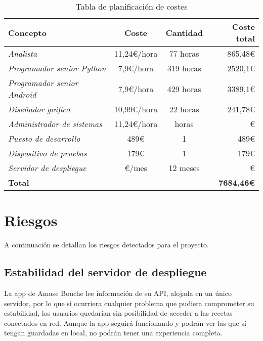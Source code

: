 \begin{table}[hbtp]
  \centering
  \begin{tabular}[h]{|l|c|c|r|}
    \hline
    \textbf{Concepto} & \textbf{Coste} & \textbf{Cantidad} & \textbf{Coste total} \\
    \hline
    \textit{Analista} & 11,24€/hora & 77 horas & 865,48€ \\
    \hline
    \textit{Programador senior Python} & 7,9€/hora & 319 horas & 2520,1€ \\
    \hline
    \textit{Programador senior Android} & 7,9€/hora & 429 horas & 3389,1€ \\
    \hline
    \textit{Diseñador gráfico} & 10,99€/hora & 22 horas & 241,78€ \\
    \hline
    \textit{Administrador de sistemas} & 11,24€/hora &  horas & € \\
    \hline
    \textit{Puesto de desarrollo} & 489€ & 1 & 489€ \\
    \hline
    \textit{Dispositivo de pruebas} & 179€ & 1 & 179€ \\
    \hline
    \textit{Servidor de despliegue} & €/mes & 12 meses & € \\
    \hline
    \textbf{Total} & \multicolumn{3}{r|}{\textbf{7684,46€}} \\
    \hline
  \end{tabular}
  \caption{Tabla de planificación de costes}
  \label{tab:costes}
\end{table}

\section{Riesgos}
\label{sec:riesgos}


A continuación se detallan los riesgos detectados para el proyecto.

\subsection{Estabilidad del servidor de despliegue}
\label{subsec:estabilidad-servidor}

La app de Amuse Bouche lee información de su API, alojada en un único servidor,
por lo que si ocurriera cualquier problema que pudiera comprometer su
estabilidad, los usuarios quedarían sin posibilidad de acceder a las recetas
conectados en red. Aunque la app seguirá funcionando y podrán ver las que sí
tengan guardadas en local, no podrán tener una experiencia completa.

